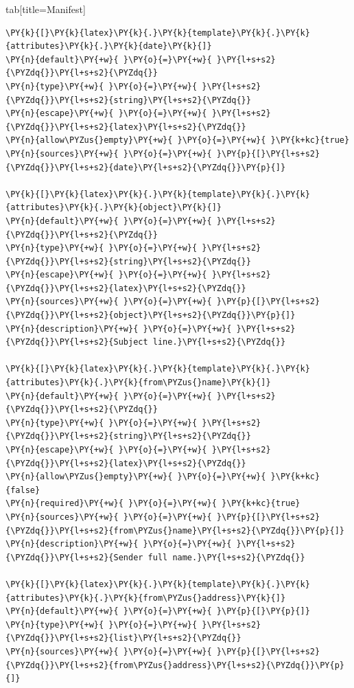\documentclass[a4paper,twoside]{article}
\begin{document}
\begin{tsdiv}{tab}[title=Manifest]
\begin{tscode}[lang=toml, engine=pygments]
\begin{Verbatim}[commandchars=\\\{\},breaklines, breakanywhere, commandchars=\\\{\}]
\PY{k}{[}\PY{k}{latex}\PY{k}{.}\PY{k}{template}\PY{k}{.}\PY{k}{attributes}\PY{k}{.}\PY{k}{date}\PY{k}{]}
\PY{n}{default}\PY{+w}{ }\PY{o}{=}\PY{+w}{ }\PY{l+s+s2}{\PYZdq{}}\PY{l+s+s2}{\PYZdq{}}
\PY{n}{type}\PY{+w}{ }\PY{o}{=}\PY{+w}{ }\PY{l+s+s2}{\PYZdq{}}\PY{l+s+s2}{string}\PY{l+s+s2}{\PYZdq{}}
\PY{n}{escape}\PY{+w}{ }\PY{o}{=}\PY{+w}{ }\PY{l+s+s2}{\PYZdq{}}\PY{l+s+s2}{latex}\PY{l+s+s2}{\PYZdq{}}
\PY{n}{allow\PYZus{}empty}\PY{+w}{ }\PY{o}{=}\PY{+w}{ }\PY{k+kc}{true}
\PY{n}{sources}\PY{+w}{ }\PY{o}{=}\PY{+w}{ }\PY{p}{[}\PY{l+s+s2}{\PYZdq{}}\PY{l+s+s2}{date}\PY{l+s+s2}{\PYZdq{}}\PY{p}{]}

\PY{k}{[}\PY{k}{latex}\PY{k}{.}\PY{k}{template}\PY{k}{.}\PY{k}{attributes}\PY{k}{.}\PY{k}{object}\PY{k}{]}
\PY{n}{default}\PY{+w}{ }\PY{o}{=}\PY{+w}{ }\PY{l+s+s2}{\PYZdq{}}\PY{l+s+s2}{\PYZdq{}}
\PY{n}{type}\PY{+w}{ }\PY{o}{=}\PY{+w}{ }\PY{l+s+s2}{\PYZdq{}}\PY{l+s+s2}{string}\PY{l+s+s2}{\PYZdq{}}
\PY{n}{escape}\PY{+w}{ }\PY{o}{=}\PY{+w}{ }\PY{l+s+s2}{\PYZdq{}}\PY{l+s+s2}{latex}\PY{l+s+s2}{\PYZdq{}}
\PY{n}{sources}\PY{+w}{ }\PY{o}{=}\PY{+w}{ }\PY{p}{[}\PY{l+s+s2}{\PYZdq{}}\PY{l+s+s2}{object}\PY{l+s+s2}{\PYZdq{}}\PY{p}{]}
\PY{n}{description}\PY{+w}{ }\PY{o}{=}\PY{+w}{ }\PY{l+s+s2}{\PYZdq{}}\PY{l+s+s2}{Subject line.}\PY{l+s+s2}{\PYZdq{}}

\PY{k}{[}\PY{k}{latex}\PY{k}{.}\PY{k}{template}\PY{k}{.}\PY{k}{attributes}\PY{k}{.}\PY{k}{from\PYZus{}name}\PY{k}{]}
\PY{n}{default}\PY{+w}{ }\PY{o}{=}\PY{+w}{ }\PY{l+s+s2}{\PYZdq{}}\PY{l+s+s2}{\PYZdq{}}
\PY{n}{type}\PY{+w}{ }\PY{o}{=}\PY{+w}{ }\PY{l+s+s2}{\PYZdq{}}\PY{l+s+s2}{string}\PY{l+s+s2}{\PYZdq{}}
\PY{n}{escape}\PY{+w}{ }\PY{o}{=}\PY{+w}{ }\PY{l+s+s2}{\PYZdq{}}\PY{l+s+s2}{latex}\PY{l+s+s2}{\PYZdq{}}
\PY{n}{allow\PYZus{}empty}\PY{+w}{ }\PY{o}{=}\PY{+w}{ }\PY{k+kc}{false}
\PY{n}{required}\PY{+w}{ }\PY{o}{=}\PY{+w}{ }\PY{k+kc}{true}
\PY{n}{sources}\PY{+w}{ }\PY{o}{=}\PY{+w}{ }\PY{p}{[}\PY{l+s+s2}{\PYZdq{}}\PY{l+s+s2}{from\PYZus{}name}\PY{l+s+s2}{\PYZdq{}}\PY{p}{]}
\PY{n}{description}\PY{+w}{ }\PY{o}{=}\PY{+w}{ }\PY{l+s+s2}{\PYZdq{}}\PY{l+s+s2}{Sender full name.}\PY{l+s+s2}{\PYZdq{}}

\PY{k}{[}\PY{k}{latex}\PY{k}{.}\PY{k}{template}\PY{k}{.}\PY{k}{attributes}\PY{k}{.}\PY{k}{from\PYZus{}address}\PY{k}{]}
\PY{n}{default}\PY{+w}{ }\PY{o}{=}\PY{+w}{ }\PY{p}{[}\PY{p}{]}
\PY{n}{type}\PY{+w}{ }\PY{o}{=}\PY{+w}{ }\PY{l+s+s2}{\PYZdq{}}\PY{l+s+s2}{list}\PY{l+s+s2}{\PYZdq{}}
\PY{n}{sources}\PY{+w}{ }\PY{o}{=}\PY{+w}{ }\PY{p}{[}\PY{l+s+s2}{\PYZdq{}}\PY{l+s+s2}{from\PYZus{}address}\PY{l+s+s2}{\PYZdq{}}\PY{p}{]}


\end{Verbatim}
\end{tscode}
\end{tsdiv}
\end{document}
